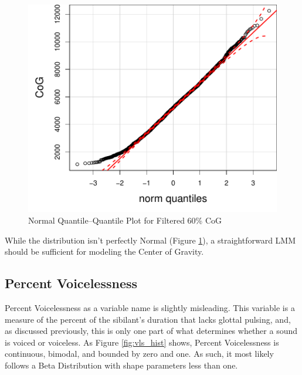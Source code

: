 \documentclass[a4paper]{article}
\begin{document}
\begin{figure}[h!]
  \begin{center}
    \begin{minipage}[t]{.4\linewidth}
      \begin{center}
\includegraphics{prelim-036}
      \end{center}
    \end{minipage}
    \caption{Normal Quantile--Quantile Plot for Filtered 60\% CoG}
    \label{fig:cog_qq}
  \end{center}
\end{figure}
\newpage
While  the distribution isn't perfectly Normal (Figure
\ref{fig:cog_qq}), a straightforward LMM should be sufficient for
modeling the Center of Gravity.


\newpage
\subsection*{Percent Voicelessness}
Percent Voicelessness as a variable name is slightly misleading.  This
variable is a measure of the percent of the sibilant's duration that
lacks glottal pulsing, and, as discussed previously, this is only one
part of what determines whether a sound is voiced or voiceless.  As
Figure \ref{fig:vls_hist} shows, Percent Voicelessness is continuous,
bimodal, and bounded by zero and one.   As such, it most likely follows a Beta
Distribution with shape parameters less than one.
\end{document}
